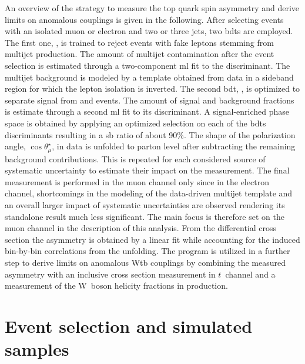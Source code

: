 An overview of the strategy to measure the top quark spin asymmetry and derive limits on anomalous couplings is given in the following. After selecting events with an isolated muon or electron and two or three jets, two \glspl{bdt} are employed. The first one, \bdtqcd, is trained to reject events with fake leptons stemming from multijet production. The amount of multijet contamination after the event selection is estimated through a two-component \gls{ml} fit to the \bdtqcd discriminant. The multijet background is modeled by a template obtained from data in a sideband region for which the lepton isolation is inverted. The second \gls{bdt}, \bdttch, is optimized to separate signal from \wjets and \ttbar events. The amount of signal and background fractions is estimate through a second \gls{ml} fit to its discriminant. A signal-enriched phase space is obtained by applying an optimized selection on each of the \glspl{bdt} discriminants resulting in a \gls{sb} ratio of about 90\%. The shape of the polarization angle, $\cos\theta^\star_{\mu}$, in data is unfolded to parton level after subtracting the remaining background contributions. This is repeated for each considered source of systematic uncertainty to estimate their impact on the measurement. The final measurement is performed in the muon channel only since in the electron channel, shortcomings in the modeling of the data-driven multijet template and an overall larger impact of systematic uncertainties are observed rendering its standalone result much less significant. The main focus is therefore set on the muon channel in the description of this analysis. From the differential cross section the asymmetry is obtained by a linear fit while accounting for the induced bin-by-bin correlations from the unfolding. The \TOPFIT program is utilized in a further step to derive limits on anomalous Wtb couplings by combining the measured asymmetry with an inclusive cross section measurement in $t$~channel and a measurement of the W~boson helicity fractions in \ttbar production.



\section{Event selection and simulated samples}
\label{sec:polarization-selection}

